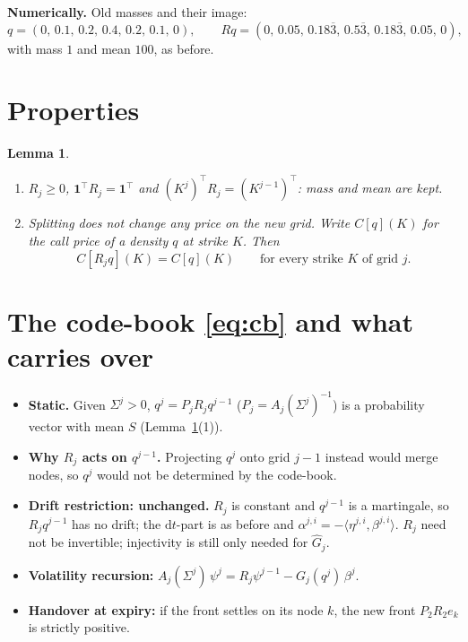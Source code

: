 \documentclass[11pt,a4paper]{article}
\newcommand{\one}{\mathbf 1}
\newcommand{\dd}{\mathrm d}
\newcommand{\dlv}{\Sigma}
\newcommand{\ip}[2]{\langle #1,#2\rangle}
\newtheorem{lemma}{Lemma}
\begin{document}
\textbf{Numerically.} Old masses and their image:
\[
  q=(0,\,0.1,\,0.2,\,0.4,\,0.2,\,0.1,\,0),\qquad
  Rq=(0,\,0.05,\,0.18\overline3,\,0.5\overline3,\,0.18\overline3,\,0.05,\,0),
\]
with mass $1$ and mean $100$, as before.

\section{Properties}
\begin{lemma}\label{lem:R}
\begin{enumerate}
\item $R_j\ge0$, $\one^{\!\top}R_j=\one^{\!\top}$ and $(K^{j})^{\!\top}R_j=(K^{j-1})^{\!\top}$:
  mass and mean are kept.
\item Splitting does not change any price on the new grid. Write $C[q](K)$ for the call
  price of a density $q$ at strike $K$. Then
  \[
    C[R_jq](K)=C[q](K)\qquad\text{for every strike $K$ of grid $j$.}
  \]
\end{enumerate}
\end{lemma}

\section{The code-book \eqref{eq:cb} and what carries over}
\begin{itemize}
\item \textbf{Static.} Given $\dlv^j>0$, $q^j=P_jR_jq^{j-1}$ ($P_j=A_j(\dlv^j)^{-1}$) is a
  probability vector with mean $S$ (Lemma~\ref{lem:R}(1)).
\item \textbf{Why $R_j$ acts on $q^{j-1}$.} Projecting $q^j$ onto grid $j-1$ instead would merge
  nodes, so $q^j$ would not be determined by the code-book.
\item \textbf{Drift restriction: unchanged.} $R_j$ is constant and $q^{j-1}$ is a martingale, so
  $R_jq^{j-1}$ has no drift; the $\dd t$-part is as before and
  $\alpha^{j,i}=-\ip{\eta^{j,i}}{\beta^{j,i}}$. $R_j$ need not be invertible; injectivity is
  still only needed for $\widehat G_j$.
\item \textbf{Volatility recursion:}
  $A_j(\dlv^j)\,\psi^j=R_j\psi^{j-1}-G_j(q^j)\,\beta^j$.
\item \textbf{Handover at expiry:} if the front settles on its node $k$, the new front
  $P_2R_2e_k$ is strictly positive.
\end{itemize}
\end{document}
